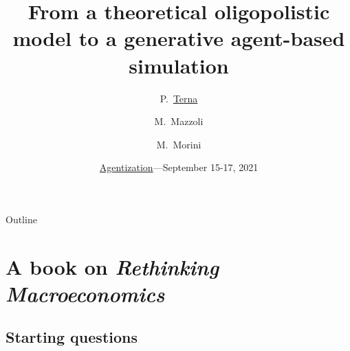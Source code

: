 \documentclass[9pt]{beamer}
\title [Oligopolistic ABM] %
{From a theoretical oligopolistic model to a generative agent-based simulation}
\author[] %
{P.~\href{https://terna.to.it}{Terna}\inst{1~2} \and M.~Mazzoli\inst{3} \and M.~Morini\inst{4~5}  }
\institute[] %
{
  \inst{1}%
 University of Torino, Italy
  \and
 \inst{2}%
  Fondazione Collegio Carlo Alberto, Honorary Fellow, Italy
 \and
  \inst{3}%
 University of Genova, Italy 
  \and
  \inst{4}%
  Credimi S.p.A., Milano, Italy
  \and
  \inst{5}%
 Ronin Institute, Montclair, New Jersey, US
  }
\date[] %
{\href{http://proteusfoundationseries.org/event/first-international-workshop-on-agentization-rendering-conventional-models-with-agent-based-computing/}{Agentization}---September 15-17, 2021}
\begin{document}
\begin{frame}
\noindent\makebox[\linewidth]{\rule{\paperwidth}{0.4pt}}

\titlepage

\end{frame}

\begin{frame}{Outline}

  \tableofcontents
\end{frame}

\section{A book on \emph{Rethinking Macroeconomics}}

\subsection{Starting questions}
\end{document}
